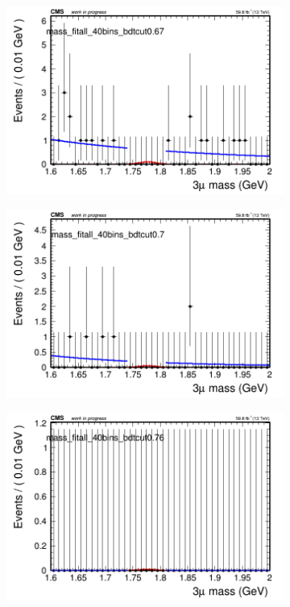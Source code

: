 \begin{figure}[H]
\begin{subfigure}{0.2\textwidth}
        \caption{}
    \end{subfigure}
    \begin{subfigure}{0.2\textwidth}
        \includegraphics[width=\textwidth]{power_law/plots/all/massfit_all_40bins_bdtcut0.67.png}
        \caption{}
    \end{subfigure}
    \begin{subfigure}{0.2\textwidth}
        \includegraphics[width=\textwidth]{power_law/plots/all/massfit_all_40bins_bdtcut0.7.png}
        \caption{}
    \end{subfigure}
    \begin{subfigure}{0.2\textwidth}
        \includegraphics[width=\textwidth]{power_law/plots/all/massfit_all_40bins_bdtcut0.76.png}

\end{subfigure}
\end{figure}
